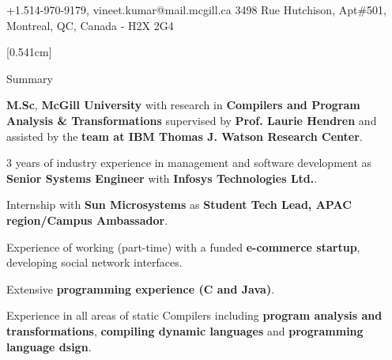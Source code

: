 \documentclass{resume} %
\begin{document}
\begin{hSubsection}{+1.514-970-9179, vineet.kumar@mail.mcgill.ca}
{%
}{3498 Rue Hutchison, Apt\#501, Montreal, QC, Canada - H2X 2G4}
\end{hSubsection}



[0.541cm]
\begin{rSection}{Summary}
\smallskip
\begin{lSubsection}
 \item \textbf{M.Sc}, \textbf{McGill University} with research in \textbf{Compilers and Program Analysis \& Transformations} supervised by \textbf{Prof. Laurie Hendren} and assisted by the \textbf{\xten team at IBM Thomas J. Watson Research Center}.
 \item 3 years of industry experience in management and software development as \textbf{Senior Systems Engineer} with \textbf{Infosys Technologies Ltd.}.
 \item Internship with \textbf{Sun Microsystems} as \textbf{Student Tech Lead, APAC region/Campus Ambassador}.
 \item Experience of working (part-time) with a funded \textbf{e-commerce startup}, developing social network interfaces.
 \item Extensive \textbf{programming experience (C and Java)}.
 \item Experience in all areas of static Compilers including \textbf{program analysis and transformations}, \textbf{compiling dynamic languages} and \textbf{programming language dsign}.
 
\end{lSubsection}
\end{rSection}
\end{document}
